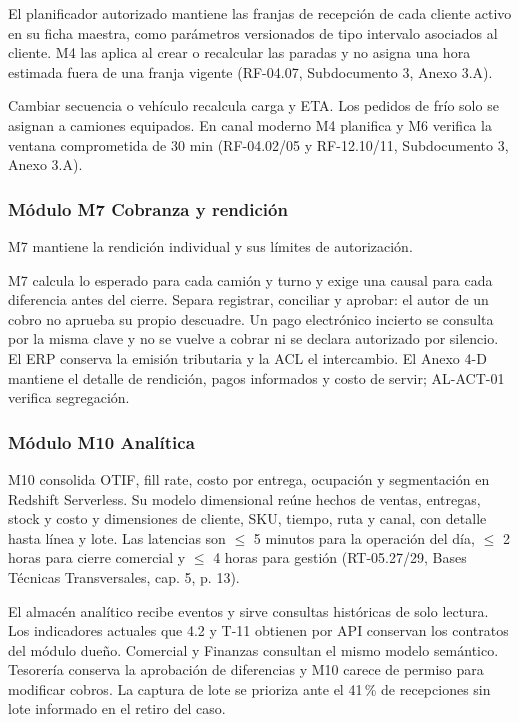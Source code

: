 El planificador autorizado mantiene las franjas de recepción de cada cliente activo en su ficha maestra, como parámetros versionados de tipo intervalo asociados al cliente. M4 las aplica al crear o recalcular las paradas y no asigna una hora estimada fuera de una franja vigente (RF-04.07, Subdocumento 3, Anexo 3.A).

Cambiar secuencia o vehículo recalcula carga y ETA. Los pedidos de frío solo se asignan a camiones equipados. En canal moderno M4 planifica y M6 verifica la ventana comprometida de 30 min (RF-04.02/05 y RF-12.10/11, Subdocumento 3, Anexo 3.A).

\subsubsection{Módulo M7 Cobranza y rendición}

M7 mantiene la rendición individual y sus límites de autorización.

M7 calcula lo esperado para cada camión y turno y exige una causal para cada diferencia antes del cierre. Separa registrar, conciliar y aprobar: el autor de un cobro no aprueba su propio descuadre. Un pago electrónico incierto se consulta por la misma clave y no se vuelve a cobrar ni se declara autorizado por silencio. El ERP conserva la emisión tributaria y la ACL el intercambio. El Anexo 4-D mantiene el detalle de rendición, pagos informados y costo de servir; AL-ACT-01 verifica segregación.

\subsubsection{Módulo M10 Analítica}

M10 consolida OTIF, fill rate, costo por entrega, ocupación y segmentación en Redshift Serverless. Su modelo dimensional reúne hechos de ventas, entregas, stock y costo y dimensiones de cliente, SKU, tiempo, ruta y canal, con detalle hasta línea y lote. Las latencias son $\leq$ 5 minutos para la operación del día, $\leq$ 2 horas para cierre comercial y $\leq$ 4 horas para gestión (RT-05.27/29, Bases Técnicas Transversales, cap. 5, p. 13).

El almacén analítico recibe eventos y sirve consultas históricas de solo lectura. Los indicadores actuales que 4.2 y T-11 obtienen por API conservan los contratos del módulo dueño. Comercial y Finanzas consultan el mismo modelo semántico. Tesorería conserva la aprobación de diferencias y M10 carece de permiso para modificar cobros. La captura de lote se prioriza ante el 41\,\% de recepciones sin lote informado en el retiro del caso.

